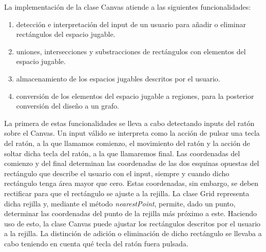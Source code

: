 La implementación de la clase Canvas atiende a las siguientes funcionalidades:
\begin{enumerate}
	\item detección e interpretación del input de un usuario para añadir o eliminar rectángulos del espacio jugable.
	\item uniones, intersecciones y substracciones de rectángulos con elementos del espacio jugable.
	\item almacenamiento de los espacios jugables descritos por el usuario.
	\item conversión de los elementos del espacio jugable a regiones, para la posterior conversión del diseño a un grafo.
\end{enumerate}

La primera de estas funcionalidades se lleva a cabo detectando inputs del ratón sobre el Canvas. Un input válido se interpreta como la acción de pulsar una tecla del ratón, a la que llamamos comienzo, el movimiento del ratón y la acción de soltar dicha tecla del ratón, a la que llamaremos final.
Las coordenadas del comienzo y del final determinan las coordenadas de las dos esquinas opuestas del rectángulo que describe el usuario con el input, siempre y cuando dicho rectángulo tenga área mayor que cero. Estas coordenadas, sin embargo, se deben rectificar para que el rectángulo se ajuste a la rejilla.
La clase Grid representa dicha rejilla y, mediante el método \textit{nearestPoint}, permite, dado un punto, determinar las coordenadas del punto de la rejilla más próximo a este. Haciendo uso de esto, la clase Canvas puede ajustar los rectángulos descritos por el usuario a la rejilla.
La distinción de adición o eliminación de dicho rectángulo se llevaba a cabo teniendo en cuenta qué tecla del ratón fuera pulsada.

